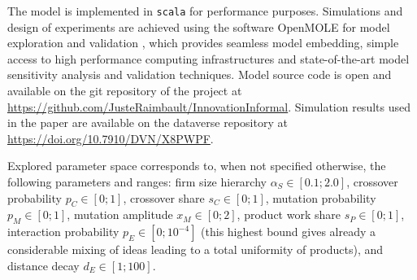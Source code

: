 \documentclass[letterpaper]{article}
\begin{document}




The model is implemented in \texttt{scala} for performance purposes. Simulations and design of experiments are achieved using the software OpenMOLE for model exploration and validation \citep{reuillon2013openmole}, which provides seamless model embedding, simple access to high performance computing infrastructures and state-of-the-art model sensitivity analysis and validation techniques. Model source code is open and available on the git repository of the project at \url{https://github.com/JusteRaimbault/InnovationInformal}. Simulation results used in the paper are available on the dataverse repository at \url{https://doi.org/10.7910/DVN/X8PWPF}.

Explored parameter space corresponds to, when not specified otherwise, the following parameters and ranges: firm size hierarchy $\alpha_S \in [0.1 ; 2.0]$, crossover probability $p_C \in [0 ; 1]$, crossover share $s_C \in [0 ; 1]$, mutation probability $p_M \in [0 ; 1]$, mutation amplitude $x_M \in [0 ; 2]$, product work share $s_P \in [0 ; 1]$, interaction probability $p_E \in [0 ; 10^{-4}]$ (this highest bound gives already a considerable mixing of ideas leading to a total uniformity of products), and distance decay $d_E \in [1 ; 100]$.
\end{document}
